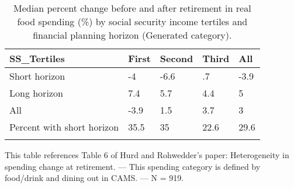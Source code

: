 \begin{table}[tbp] \centering
{}

\caption{Median percent change before and after retirement in real food spending (\%) by social security income tertiles and financial planning horizon (Generated category).}
\begin{tabularx}{\textwidth}{lCCCC}

\toprule
{SS\_Tertiles}&{First}&{Second}&{Third}&{All} \tabularnewline
\midrule\addlinespace[1.5ex]
Short horizon&-4&-6.6&.7&-3.9 \tabularnewline
Long horizon&7.4&5.7&4.4&5 \tabularnewline
All&-3.9&1.5&3.7&3 \tabularnewline
Percent with short horizon&35.5&35&22.6&29.6 \tabularnewline
\bottomrule \addlinespace[1.5ex]

\end{tabularx}
\begin{flushleft}
\footnotesize This table references Table 6 of Hurd and Rohwedder's paper: Heterogeneity in spending change at retirement. \linebreak --- \linebreak This spending category is defined by food/drink and dining out in CAMS. \linebreak --- \linebreak N = 919.
\end{flushleft}
\end{table}
